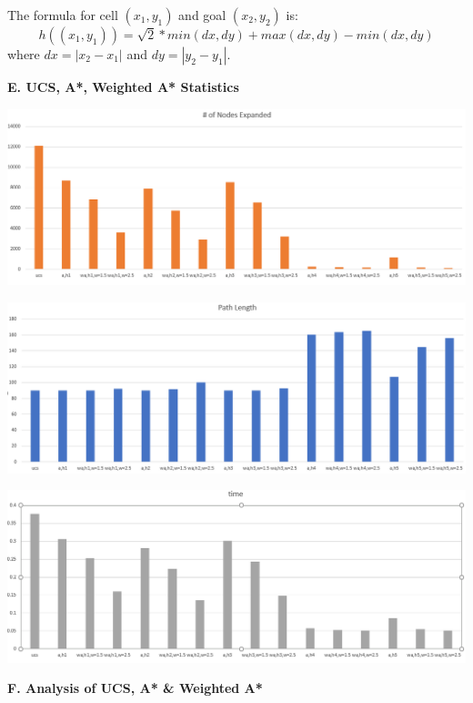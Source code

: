\documentclass[12pt, letterpaper]{article}
\begin{document}
The formula for cell $(x_1, y_1)$ and goal $(x_2, y_2)$ is:
$$h((x_1,y_1)) = \sqrt{2} * min(dx, dy) + max(dx, dy) - min(dx, dy)$$
where $dx = |x_2 - x_1|$ and $dy = |y_2 - y_1|$. 

\pagebreak %

\noindent \textbf{E. UCS, A*, Weighted A* Statistics}

\noindent \includegraphics[scale=0.65]{"avg-nodeexpanded"}

\medskip

\noindent \includegraphics[scale=0.65]{"avg-pathlength"}

\medskip

\noindent \includegraphics[scale=0.65]{"avg-runtime"}

\medskip

\pagebreak %

\noindent \textbf{F. Analysis of UCS, A* \& Weighted A*}
\end{document}
